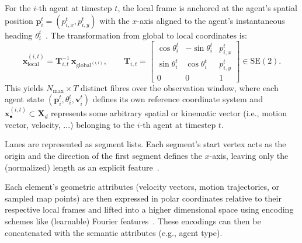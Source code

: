 \begin{description}[style=nextline,leftmargin=*]
  \item[Agent states.]
        For the \(i\)-th agent at timestep \(t\), the local frame is anchored at the agent's spatial position \(\mathbf{p}_i^t = (p_{i,x}^t, p_{i,y}^t)\) with the \(x\)-axis aligned to the agent's instantaneous heading \(\theta_i^t\)~\cite{lmformerYadav2025}. The transformation from global to local coordinates is:
        \begin{equation}
            \mathbf x^{(i,t)}_{\text{local}}
            =\mathbf T_{i,t}^{-1}\,\mathbf x_{\text{global}^{(i,t)}},
            \qquad\mathbf T_{i,t} =
            \begin{bmatrix}
            \cos\theta_i^t & -\sin\theta_i^t & p_{i,x}^t \\
            \sin\theta_i^t & \cos\theta_i^t & p_{i,y}^t \\
            0 & 0 & 1
            \end{bmatrix} \in \mathrm{SE}(2).
            \label{eq:agent_frame}
        \end{equation}
        This yields \(N_{\max} \times T\) distinct fibres over the observation window, where each agent state \((\mathbf{p}_i^t, \theta_i^t, \mathbf{v}_i^t)\) defines its own reference coordinate system and \( \mathbf{x}_{\bullet}^{(i,t)} \subset \mathbf{X}_d \) represents some arbitrary spatial or kinematic vector (i.e., motion vector, velocity, ...) belonging to the \(i\)-th agent at timestep \(t\).

  \item[Map elements.]
        Lanes are represented as segment lists. Each segment's start vertex acts as the origin and the direction of the first segment defines the \(x\)-axis, leaving only the (normalized) length as an explicit feature~\cite{lmformerYadav2025}.
\end{description}

Each element's geometric attributes (velocity vectors, motion trajectories, or sampled map points) are then expressed in polar coordinates relative to their respective local frames and lifted into a higher dimensional space using encoding schemes like (learnable) Fourier features~\cite{qcnetZhou2023, li2021llearnableFourier}. These encodings can then be concatenated with the semantic attributes (e.g., agent type).


